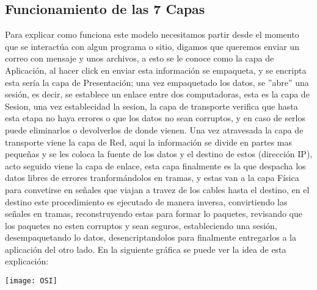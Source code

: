 \subsection{Funcionamiento de las 7 Capas}
Para explicar como funciona este modelo necesitamos partir desde el momento que se interactúa con algun programa o sitio, digamos que queremos enviar un correo con mensaje y unos archivos, a esto se le conoce como la capa de Aplicación, al hacer click en enviar esta información se empaqueta, y se encripta esta sería la capa de Presentación; una vez empaquetado los datos, se ''abre'' una sesión, es decir, se establece un enlace entre dos computadoras, esta es la capa de Sesion, una vez establecidad la sesion, la capa de transporte verifica que hasta esta etapa no haya errores o que los datos no sean corruptos, y en caso de serlos puede eliminarlos o devolverlos de donde vienen. Una vez atravesada la capa de transporte viene la capa de Red, aqui la información se divide en partes mas pequeñas y se les coloca la fuente de los datos y el destino de estos (dirección IP), acto seguido viene la capa de enlace, esta capa finalmente es la que despacha los datos libres de errores tranformándolos en tramas, y estas van a la capa Física para convetirse en señales que viajan a travez de los cables hasta el destino, en el destino este procedimiento es ejecutado de manera inversa, convirtiendo las señales en tramas, reconstruyendo estas para formar lo paquetes, revisando que los paquetes no esten corruptos y sean seguros, estableciendo una sesión, desempaquetando lo datos, desencriptandolos para finalmente entregarlos a la aplicación del otro lado. En la siguiente gráfica se puede ver la idea de esta explicación:

\begin{center}

\texttt{[image: OSI]}

\end{center}


